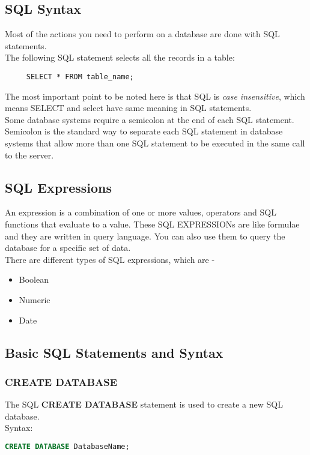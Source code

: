  \subsection*{{SQL Syntax}}
 Most of the actions you need to perform on a database are done with SQL statements.\\
 The following SQL statement selects all the records in a table:
 \begin{verbatim}
     SELECT * FROM table_name;
 \end{verbatim}
 The most important point to be noted here is that SQL is \emph{case insensitive}, which means SELECT and select have same meaning in SQL statements.\\
 Some database systems require a semicolon at the end of each SQL statement.\\
 Semicolon is the standard way to separate each SQL statement in database systems that allow more than one SQL statement to be executed in the same call to the server.
 
 
 \subsection*{{SQL Expressions}}
 An expression is a combination of one or more values, operators and SQL functions that evaluate to a value. These SQL EXPRESSIONs are like formulae and they are written in query language. You can also use them to query the database for a specific set of data.\\
 There are different types of SQL expressions, which are {-}
 \begin{itemize}
     \item Boolean
     \item Numeric
     \item Date
 \end{itemize}
 
 
 \subsection*{{Basic SQL Statements and Syntax}}
 
 \subsubsection*{{CREATE DATABASE}}
 The SQL \textbf{CREATE DATABASE} statement is used to create a new SQL database.\\
 Syntax: 
 \begin{lstlisting}[language=SQL]
    CREATE DATABASE DatabaseName;
 \end{lstlisting}
 
